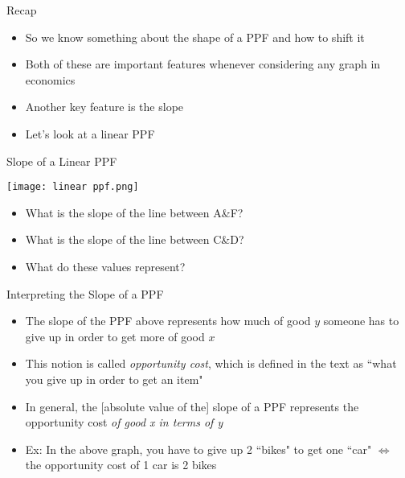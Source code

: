 \documentclass[10pt,xcolor={svgnames}]{beamer}
\begin{document}
\begin{frame}{Recap}
\begin{itemize}
    \item So we know something about the shape of a PPF and how to shift it
    \item Both of these are important features whenever considering any graph in economics
    \item Another key feature is the slope
    \item Let's look at a linear PPF
    
\end{itemize}
\end{frame}

\begin{frame}{Slope of a Linear PPF}
\begin{center}
    \texttt{[image: linear ppf.png]}
\end{center}
\begin{itemize}
    \item What is the slope of the line between A\&F? 
    \item What is the slope of the line between C\&D?
    \item What do these values represent?
\end{itemize}
\end{frame}

\begin{frame}{Interpreting the Slope of a PPF}
\begin{center}
\end{center}
\begin{itemize}[<+>]
    \item The slope of the PPF above represents how much of good $y$ someone has to give up in order to get more of good $x$
    \item This notion is called \textit{opportunity cost}, which is defined in the text as ``what you give up in order to get an item"
    \item In general, the [absolute value of the] slope of a PPF represents the opportunity cost \textit{of good x in terms of y}
    \item Ex: In the above graph, you have to give up 2 ``bikes" to get one ``car" $\iff$ the opportunity cost of 1 car is 2 bikes
\end{itemize}
\end{frame}
\end{document}
